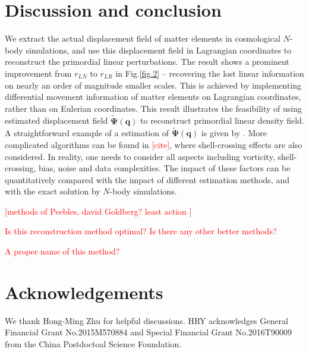 \documentclass[aps,prd,twocolumn,superscriptaddress,amsfont,amssymb,amsmath,nofootinbib,showpacs,balancelastpage]{revtex4-1}
\newcommand{\bs}{\boldsymbol}
\newcommand{\tcr}{\textcolor{red}}
\begin{document}
\section{Discussion and conclusion}\label{sec.discussion}
We extract the actual displacement field of matter elements in cosmological $N$-body
simulations, and use this displacement field in Lagrangian coordinates to reconstruct
the primordial linear perturbations. The result shows a prominent improvement from
$r_{LN}$ to $r_{LR}$ in Fig.\ref{fig.2} -- recovering the lost linear information on
nearly an order of magnitude smaller scales.
This is achieved by implementing differential movement information
of matter elements on Lagrangian coordinates, rather than on
Eulerian coordinates. This result illustrates the feasibility
of using estimated displacement field $\tilde{\bs \Psi}(\bs q)$ to reconstruct primordial linear
density field. A straightforward example of a estimation of $\tilde{\bs \Psi}(\bs q)$
is given by \cite{1995ApJS..100..269P,1998ApJS..115...19P}.
More complicated algorithms can be found in \tcr{[cite]}, where
shell-crossing effects are also considered. In reality, one needs
to consider all aspects including vorticity, shell-crossing, bias, noise
and data complexities. The impact of these factors can be quantitatively
compared with the impact of different estimation methods, and with
the exact solution by $N$-body simulations.

\cite{1989ApJ...344L..53P,2000ApJ...544...21G}
\tcr{[methods of Peebles, david Goldberg? least action ]}

\tcr{Is this reconstruction method optimal? Is there any other better methods?}

\tcr{A proper name of this method?}

\section*{Acknowledgements}
We thank Hong-Ming Zhu for helpful discussions.
HRY acknowledges General Financial Grant No.2015M570884 and Special Financial Grant No.2016T90009 from the China Postdoctoal Science Foundation.

%


\end{document}
